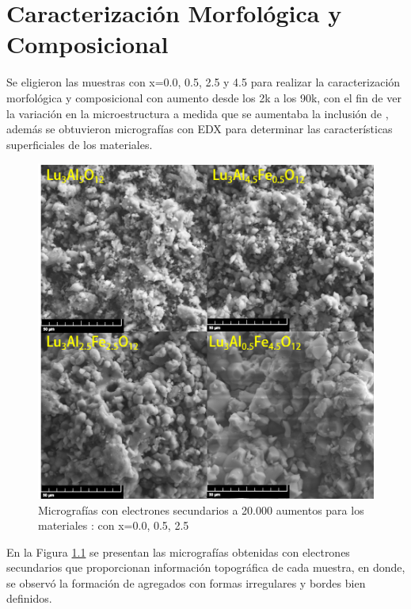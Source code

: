 \chapter{Caracterización Morfológica y Composicional}
\label{MEB}
Se eligieron las muestras con x=0.0, 0.5, 2.5 y 4.5 para realizar la
caracterización morfológica y composicional con aumento desde los 2k a los 90k,
con el fin de ver la variación en la microestructura a medida que se aumentaba
la inclusión de , además se obtuvieron micrografías con EDX para
determinar las características superficiales de los materiales.\\

\begin{figure}[h]
    \centering%

    \includegraphics[width=12cm]{Kap5/sec20k.png}%
    \caption{Micrografías con electrones secundarios a 20.000 aumentos para los
    materiales : con x=0.0, 0.5, 2.5
    }\label{fig:sec20}
\end{figure}

En la Figura \ref{fig:sec20} se presentan las micrografías obtenidas con
electrones
secundarios que proporcionan información topográfica de cada
muestra, en donde, se observó la formación de agregados con formas irregulares
y bordes bien definidos.\\

